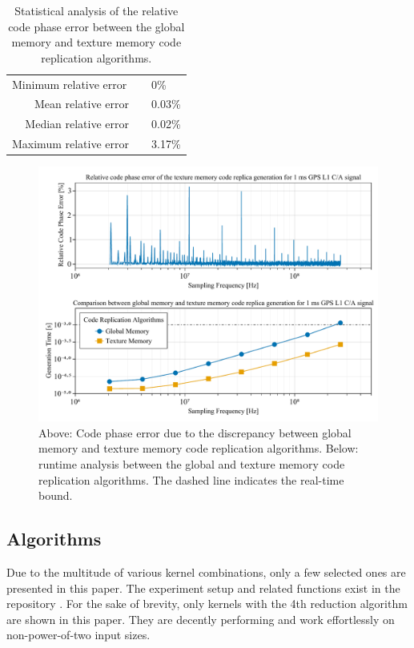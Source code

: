 \documentclass{juliacon}
\begin{document}
\begin{table}
  \centering
  \caption{\label{tab:code-phase-error} Statistical analysis of the relative code phase error between the global memory and texture memory code replication algorithms.}
  \begin{tabular}{rcl}
  \multicolumn{1}{l}{Minimum relative error} & \multicolumn{1}{l}{} & 0\%                       \\
  Mean relative error                        &                      & 0.03\%  \\
  Median relative error                      &                      & 0.02\%  \\
  Maximum relative error                     &                      & 3.17\% 
  \end{tabular}
\end{table}

\begin{figure}
  \centering
  \includegraphics[scale = 0.6]{code_phase.pdf}
  \caption{\label{fig:code-phase}Above: Code phase error due to the discrepancy between global memory and texture memory code replication algorithms. Below: runtime analysis between the global and texture memory code replication algorithms. The dashed line indicates the real-time bound.}
\end{figure}

\subsection*{Algorithms}
Due to the multitude of various kernel combinations, only a few selected ones are presented in this paper. The experiment setup and related functions exist in the repository \cite{Ozmaden2022}. For the sake of brevity, only kernels with the 4th reduction algorithm are shown in this paper. They are decently performing and work effortlessly on non-power-of-two input sizes. 
\end{document}
